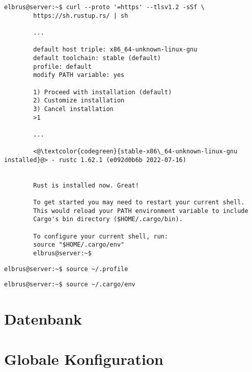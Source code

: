 \documentclass{article}
\begin{document}
	\lstset{style=commands}
	\begin{lstlisting}[caption={Installieren von Rust.}]
		elbrus@server:~$ curl --proto '=https' --tlsv1.2 -sSf \
		https://sh.rustup.rs/ | sh
		 
		...
		 
		default host triple: x86_64-unknown-linux-gnu
		default toolchain: stable (default)
		profile: default
		modify PATH variable: yes
		
		1) Proceed with installation (default)
		2) Customize installation
		3) Cancel installation
		>1
		
		...
		
		<@\textcolor{codegreen}{stable-x86\_64-unknown-linux-gnu installed}@> - rustc 1.62.1 (e092d0b6b 2022-07-16)
		
		
		Rust is installed now. Great!
		
		To get started you may need to restart your current shell.
		This would reload your PATH environment variable to include
		Cargo's bin directory ($HOME/.cargo/bin).
		
		To configure your current shell, run:
		source "$HOME/.cargo/env"
		elbrus@server:~$
	\end{lstlisting}
	
	\lstset{style=commands}
	\begin{lstlisting}[caption={Laden der Variablen aus dem Terminal Profil.}]
		elbrus@server:~$ source ~/.profile
	\end{lstlisting}

	\lstset{style=commands}
	\begin{lstlisting}[caption={Hinzufügen des Befehls Cargo zu dem Pfad.}]
		elbrus@server:~$ source ~/.cargo/env
	\end{lstlisting}
	\newpage
	
	
	\section{Datenbank}
	
	\newpage
	
	\section{Globale Konfiguration}
	
	\newpage
	
\end{document}
